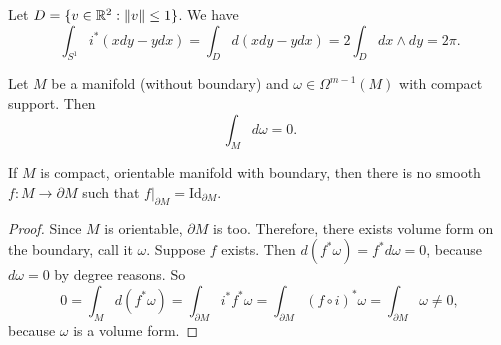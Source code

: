 \begin{eg}
    Let $D = \{v \in \mathbb{R}^2 : \|v\| \le  1\}$.
We have
$$
        \int_{S^{1}} i^*(x dy - ydx) = \int_{D} d(x dy - y dx)  
            = 2 \int_D dx \wedge dy                                      = 2\pi.
$$
\end{eg}
\begin{corollary}
    Let $M$ be a manifold (without boundary)
    and $\omega \in \Omega^{m-1}(M)$ with compact support.
    Then
    \[
    \int_M d\omega = 0
    .\] 
\end{corollary}
\begin{corollary}
    If $M$ is compact, orientable manifold with boundary, then there is no smooth $f: M \to \partial M$ such that $f|_{\partial M} = \text{Id}_{\partial M}$.
\end{corollary}
\begin{proof}
    Since $M$ is orientable, $\partial M$ is too.
    Therefore, there exists volume form on the boundary, call it $\omega$.
    Suppose  $f$ exists.
    Then $d(f^* \omega) = f^* d \omega = 0$, because $d \omega = 0$ by degree reasons. So
     \[
 0= \int_{M} d(f^*\omega) = 
         \int_{\partial M} i^*f^*\omega =
         \int_{\partial M} (f  \circ  i)^*\omega =
         \int_{\partial M} \omega \neq 0
    ,\] 
    because  $\omega$ is a volume form.
\end{proof}
